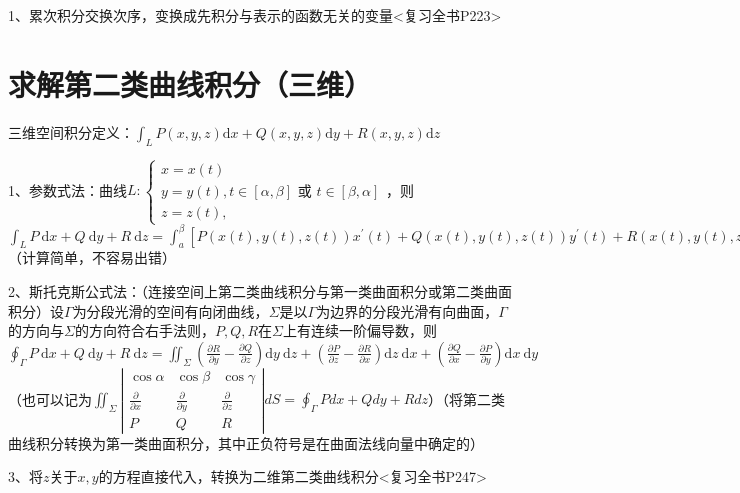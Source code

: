 1、累次积分交换次序，变换成先积分与表示的函数无关的变量<复习全书P223>

\section{求解第二类曲线积分（三维）}

三维空间积分定义：$ \int_{L} P(x, y, z) \mathrm{d} x+Q(x, y, z) \mathrm{d} y+R(x, y, z) \mathrm{d} z $

1、参数式法：曲线$ L:\left\{\begin{array}{l}x=x(t) \\ y=y(t), t \in[\alpha, \beta] \text { 或 } t \in[\beta, \alpha]\\ z=z(t),\end{array}\right. $，则$ \int_{L} P \mathrm{~d} x+Q \mathrm{~d} y+R \mathrm{~d} z= \int_{a}^{\beta}\left[P(x(t), y(t), z(t)) x^{\prime}(t)+Q(x(t), y(t), z(t)) y^{\prime}(t)+R(x(t), y(t), z(t)) z^{\prime}(t)\right] \mathrm{d} t $（计算简单，不容易出错）

2、斯托克斯公式法：（连接空间上第二类曲线积分与第一类曲面积分或第二类曲面积分）设$ \Gamma $为分段光滑的空间有向闭曲线，$ \Sigma $是以$ \Gamma $为边界的分段光滑有向曲面，$ \Gamma $的方向与$ \Sigma $的方向符合右手法则，$ P, Q, R $在$ \Sigma $上有连续一阶偏导数，则$ \oint_{\Gamma} P \mathrm{~d} x+Q \mathrm{~d} y+R \mathrm{~d} z=\iint_{\Sigma}\left(\frac{\partial R}{\partial y}-\frac{\partial Q}{\partial z}\right) \mathrm{d} y \mathrm{~d} z+\left(\frac{\partial P}{\partial z}-\frac{\partial R}{\partial x}\right) \mathrm{d} z \mathrm{~d} x+\left(\frac{\partial Q}{\partial x}-\frac{\partial P}{\partial y}\right) \mathrm{d} x \mathrm{~d} y $（也可以记为$ \iint_{\Sigma}\left|\begin{array}{ccc}\cos \alpha & \cos \beta & \cos \gamma \\\frac{\partial}{\partial x} & \frac{\partial}{\partial y} & \frac{\partial}{\partial z} \\P & Q & R\end{array}\right| d S=\oint_{\Gamma} P d x+Q d y+R d z $）（将第二类曲线积分转换为第一类曲面积分，其中正负符号是在曲面法线向量中确定的）

3、将$ z $关于$ x,y $的方程直接代入，转换为二维第二类曲线积分<复习全书P247>

